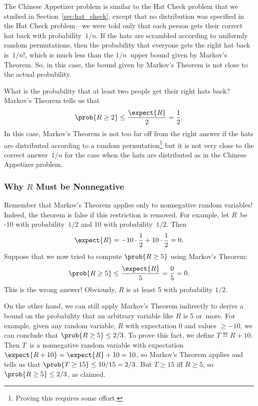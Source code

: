 The Chinese Appetizer problem is similar to the Hat Check problem that
we studied in Section~\ref{sec:hat_check}, except that no distribution
was specified in the Hat Check problem---we were told only that each
person gets their correct hat back with probability~$1/n$.  If the
hats are scrambled according to uniformly random permutations, then
the probability that everyone gets the right hat back is~$1/n!$, which
is much less than the $1/n$~upper bound given by Markov's Theorem.
So, in this case, the bound given by Markov's Theorem is not close to
the actual probability.

What is the probability that at least two people get their right hats
back?  Markov's Theorem tells us that
\begin{equation*}
    \prob{R \ge 2} \le \frac{\expect{R}}{2} = \frac{1}{2}.
\end{equation*}
In this case, Markov's Theorem is not too far off from the right
answer if the hats are distributed according to a random
permutation\footnote{Proving this requires some effort.} but it is not
very close to the correct answer~$1/n$ for the case when the hats are
distributed as in the Chinese Appetizer problem.

\subsubsection{Why $R$ Must be Nonnegative}

Remember that Markov's Theorem applies only to nonnegative random
variables!  Indeed, the theorem is false if this restriction is
removed.  For example, let $R$~be -10 with probability~$1/2$ and 10
with probability~$1/2$.  Then
\[
\expect{R} = -10 \cdot \frac{1}{2} + 10 \cdot \frac{1}{2} = 0.
\]
Suppose that we now tried to compute $\prob{R \geq 5}$ using Markov's
Theorem:
\begin{equation*}
  \prob{R \geq 5} \leq \frac{\expect{R}}{5} = \frac{0}{5} = 0.
\end{equation*}
This is the wrong answer!  Obviously, $R$ is at least 5 with
probability $1/2$.

On the other hand, we can still apply Markov's Theorem indirectly to
derive a bound on the probability that an arbitrary variable like $R$
is 5 or~more.  For example, given any random variable, $R$ with expectation 0
and values $\geq -10$, we can conclude that $\prob{R \geq 5} \le 2/3$.
To prove this fact, we define $T \eqdef R+10$.  Then $T$~is a
nonnegative random variable with expectation $\expect{R + 10} =
\expect{R}+10= 10$, so Markov's Theorem applies and tells us that
$\prob{T \geq 15} \le 10/15 = 2/3$.  But $T \geq 15$ iff $R \geq 5$, so
$\prob{R \geq 5} \leq 2/3$, as claimed.

